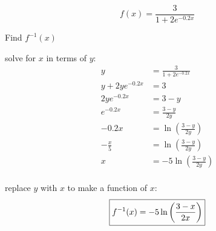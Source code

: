 \documentclass[fleqn,addpoints]{exam}
\begin{document}
\begin{questions}



    \bonusquestion[10]
      \[
        f(x) = \frac{3}{1 + 2e^{-0.2x}} 
      \]

      Find $f^{-1}(x)$

      \begin{solution}

        solve for $x$ in terms of $y$:
        \begin{align*}
          y               & = \frac{3}{1 + 2e^{-0.2x}} \\
          y + 2ye^{-0.2x} & = 3 \\
          2ye^{-0.2x}     & = 3 - y \\
          e^{-0.2x}       & = \frac{3 - y}{2y} \\
          -0.2x           & = \ln \left( \frac{3 - y}{2y} \right) \\
          - \frac{x}{5}   & = \ln \left( \frac{3 - y}{2y} \right) \\
          x               & = -5 \ln \left( \frac{3 - y}{2y} \right) \\
        \end{align*}
        
        replace $y$ with $x$ to make a function of $x$:
        \[
          \boxed{ f^{-1}(x) = -5 \ln \left( \frac{3 - x}{2x} \right) } \\
        \]

      \end{solution}
  \end{questions}
\end{document}
